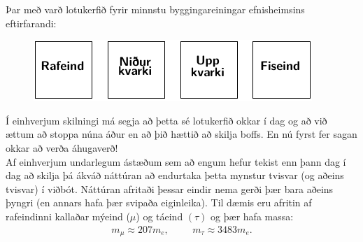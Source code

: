 \ifdefined \wholebook \else\documentclass[oneside]{book}\usepackage{EdlBook}\graphicspath{{figures/}}
\begin{document}
\begin{figure}[H]
    \centering
    \qquad
\end{figure}


Þar með varð lotukerfið fyrir minnstu byggingareiningar efnisheimsins eftirfarandi:

\begin{figure}[H]
    \centering
    \includegraphics[width=.5\textwidth]{figures/lotukerfi4.pdf}
\end{figure}

Í einhverjum skilningi má segja að þetta sé lotukerfið okkar í dag og að við ættum að stoppa núna áður en að þið hættið að skilja boffs. En nú fyrst fer sagan okkar að verða áhugaverð! \\

Af einhverjum undarlegum ástæðum sem að engum hefur tekist enn þann dag í dag að skilja þá ákváð náttúran að endurtaka þetta mynstur tvisvar (og aðeins tvisvar) í viðbót. Náttúran afritaði þessar eindir nema gerði þær bara aðeins þyngri (en annars hafa þær svipaða eiginleika). Til dæmis eru afritin af rafeindinni kallaðar mýeind ($\mu$) og táeind $(\tau)$ og þær hafa massa:
\begin{align*}
    m_{\mu} \approx 207 m_e, \hspace{1cm} m_\tau \approx 3483 m_e.
\end{align*}
\end{document}
